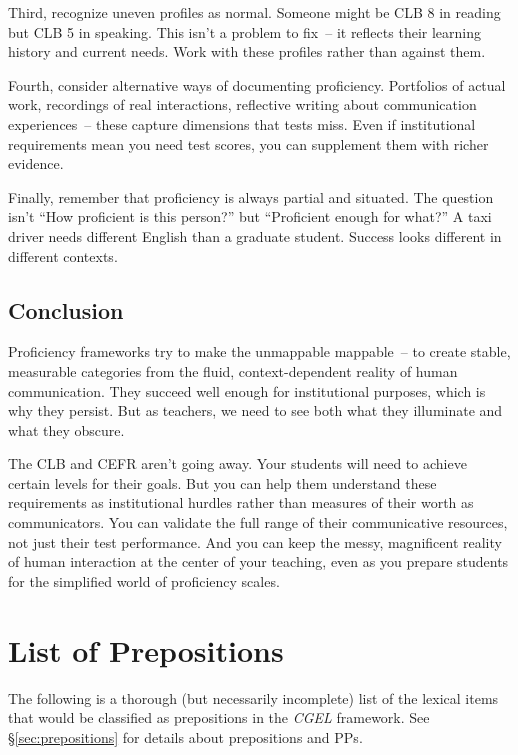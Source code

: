 Third, recognize uneven profiles as normal. Someone might be CLB 8 in reading but CLB 5 in speaking. This isn't a problem to fix~-- it reflects their learning history and current needs. Work with these profiles rather than against them.

Fourth, consider alternative ways of documenting proficiency. Portfolios of actual work, recordings of real interactions, reflective writing about communication experiences~-- these capture dimensions that tests miss. Even if institutional requirements mean you need test scores, you can supplement them with richer evidence.

Finally, remember that proficiency is always partial and situated. The question isn't ``How proficient is this person?'' but ``Proficient enough for what?'' A taxi driver needs different English than a graduate student. Success looks different in different contexts.

\section{Conclusion}

Proficiency frameworks try to make the unmappable mappable~-- to create stable, measurable categories from the fluid, context-dependent reality of human communication. They succeed well enough for institutional purposes, which is why they persist. But as teachers, we need to see both what they illuminate and what they obscure.

The CLB and CEFR aren't going away. Your students will need to achieve certain levels for their goals. But you can help them understand these requirements as institutional hurdles rather than measures of their worth as communicators. You can validate the full range of their communicative resources, not just their test performance. And you can keep the messy, magnificent reality of human interaction at the center of your teaching, even as you prepare students for the simplified world of proficiency scales.




\chapter{List of Prepositions} \label{sec:preps-list}

The following is a thorough (but necessarily incomplete) list of the lexical items that would be classified as prepositions in the \textit{CGEL} framework. See \S\ref{sec:prepositions} for details about prepositions and PPs.

